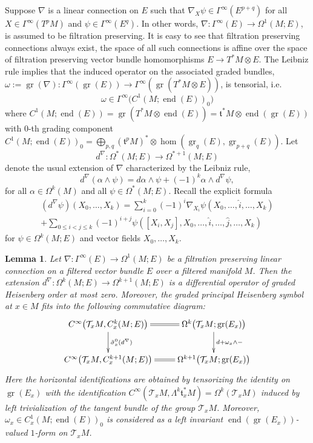 \documentclass[reqno,12pt]{amsart}
\DeclareMathOperator{\gr}{gr}
\DeclareMathOperator{\eend}{end}
\theoremstyle{plain}
\newtheorem{lemma}[theorem]{Lemma}
\theoremstyle{definition}
\begin{document}
Suppose $\nabla$ is a linear connection on $E$ such that
$\nabla_X\psi\in\Gamma^\infty(E^{p+q})$ for all $X\in\Gamma^\infty(T^pM)$ and $\psi\in\Gamma^\infty(E^q)$.
In other words, $\nabla\colon\Gamma^\infty(E)\to\Omega^1(M;E)$, is assumed to be filtration preserving.
It is easy to see that filtration preserving connections always exist, the space of all such connections is affine over the space of filtration preserving vector bundle homomorphisms $E\to T^*M\otimes E$.
The Leibniz rule implies that the induced operator on the associated graded bundles, $\omega:=\gr(\nabla)\colon\Gamma^\infty(\gr(E))\to\Gamma^\infty(\gr(T^*M\otimes E))$, is tensorial, i.e.\
$$
\omega\in\Gamma^\infty\bigl(C^1(M;\eend(E))_0\bigr)
$$
where $C^1(M;\eend(E))=\gr(T^*M\otimes\eend(E))=\mathfrak t^*M\otimes\eend(\gr(E))$ with $0$-th grading component $C^1(M;\eend(E))_0=\bigoplus_{p,q}(\mathfrak t^pM)^*\otimes\hom(\gr_q(E),\gr_{p+q}(E))$.
Let 
\begin{equation}\label{E:dnabla}
d^\nabla\colon\Omega^*(M;E)\to\Omega^{*+1}(M;E)
\end{equation}
denote the usual extension of $\nabla$ characterized by the Leibniz rule,
\begin{equation}\label{E:leibn}
d^\nabla(\alpha\wedge\psi)=d\alpha\wedge\psi+(-1)^k\alpha\wedge d^\nabla\psi,
\end{equation}
for all $\alpha\in\Omega^k(M)$ and all $\psi\in\Omega^*(M;E)$.
Recall the explicit formula
\begin{multline}\label{E:dnablaf}
(d^\nabla\psi)(X_0,\dotsc,X_k)
=\sum_{i=0}^k(-1)^i\nabla_{X_i}\psi(X_0,\dotsc,\hat i,\dotsc,X_k)
\\+\sum_{0\leq i<j\leq k}(-1)^{i+j}\psi([X_i,X_j],X_0,\dotsc,\hat i,\dotsc,\hat j,\dotsc,X_k)
\end{multline}
for $\psi\in\Omega^k(M;E)$ and vector fields $X_0,\dotsc,X_k$.


\begin{lemma}\label{L:symb}
Let $\nabla\colon\Gamma^\infty(E)\to\Omega^1(M;E)$ be a filtration preserving linear connection on a filtered vector bundle $E$ over a filtered manifold $M$.
Then the extension $d^\nabla\colon\Omega^k(M;E)\to\Omega^{k+1}(M;E)$ is a differential operator of graded Heisenberg order at most zero.
Moreover, the graded principal Heisenberg symbol at $x\in M$ fits into the following commutative diagram:
$$
\xymatrix{
C^\infty\bigl(\mathcal T_xM,C_x^k(M;E)\bigr)\ar@{=}[r]\ar[d]^-{\tilde\sigma^0_x(d^\nabla)}
&\Omega^k\bigl(\mathcal T_xM;\gr(E_x)\bigr)\ar[d]^-{d+\omega_x\wedge-}
\\
C^\infty\bigl(\mathcal T_xM,C_x^{k+1}(M;E)\bigr)\ar@{=}[r]
&\Omega^{k+1}\bigl(\mathcal T_xM;\gr(E_x)\bigr)
}
$$
Here the horizontal identifications are obtained by tensorizing the identity on $\gr(E_x)$ with the identification $C^\infty(\mathcal T_xM,\Lambda^k\mathfrak t_x^*M)=\Omega^k(\mathcal T_xM)$ induced by left trivialization of the tangent bundle of the group $\mathcal T_xM$.
Moreover, $\omega_x\in C^1_x(M;\eend(E))_0$ is considered as a left invariant $\eend(\gr(E_x))$-valued $1$-form on $\mathcal T_xM$.
\end{lemma}
\end{document}
